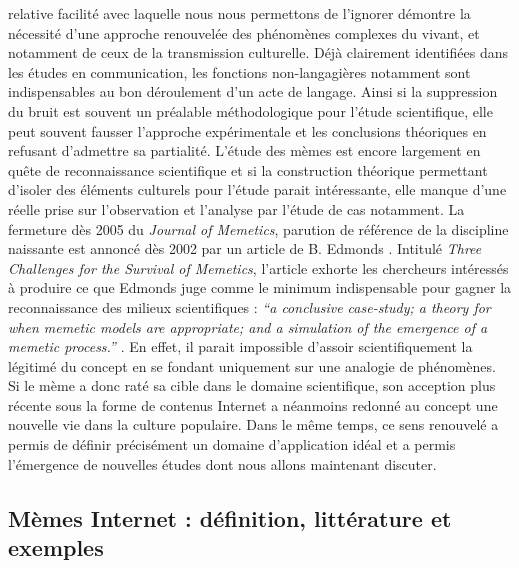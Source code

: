 relative facilit\'e avec laquelle nous nous permettons de l{\textquoteright}ignorer d\'emontre la n\'ecessit\'e d{\textquoteright}une approche renouvel\'ee des ph\'enom\`enes complexes du vivant, et notamment de ceux de la transmission culturelle. D\'ej\`a clairement identifi\'ees dans les \'etudes en communication, les fonctions non-langagi\`eres notamment sont indispensables au bon d\'eroulement d{\textquoteright}un acte de langage. Ainsi si la suppression du bruit est souvent un pr\'ealable m\'ethodologique pour l{\textquoteright}\'etude scientifique, elle peut souvent fausser l{\textquoteright}approche exp\'erimentale et les conclusions th\'eoriques en refusant d{\textquoteright}admettre sa partialit\'e. L{\textquoteright}\'etude des m\`emes est encore largement en qu\^ete de reconnaissance scientifique et si la construction th\'eorique permettant d{\textquoteright}isoler des \'el\'ements culturels pour l{\textquoteright}\'etude parait int\'eressante, elle manque d{\textquoteright}une r\'eelle prise sur l{\textquoteright}observation et l{\textquoteright}analyse par l{\textquoteright}\'etude de cas notamment. La fermeture d\`es 2005 du \textit{Journal of Memetics}, parution de r\'ef\'erence de la discipline naissante est annonc\'e d\`es 2002 par un article de B. Edmonds \cite{Jouxtel2014}. Intitul\'e \textit{Three Challenges for the Survival of Memetics}, l{\textquoteright}article\textit{ }exhorte les chercheurs int\'eress\'es \`a produire ce que Edmonds juge comme le minimum indispensable pour gagner la reconnaissance des milieux scientifiques : \textit{{\textquotedblleft}a conclusive case-study; a theory for when memetic models are appropriate; and a simulation of the emergence of a memetic process.{\textquotedblright}} \cite{Edmonds2002}.  
En effet, il parait impossible d{\textquoteright}assoir scientifiquement la l\'egitim\'e du concept en se fondant uniquement sur une analogie de ph\'enom\`enes. Si le m\`eme a donc rat\'e sa cible dans le domaine scientifique, son acception plus r\'ecente sous la forme de contenus Internet a n\'eanmoins redonn\'e au concept une nouvelle vie dans la culture populaire. Dans le m\^eme temps, ce sens renouvel\'e a permis de d\'efinir pr\'ecis\'ement un domaine d{\textquoteright}application id\'eal et a permis l{\textquoteright}\'emergence de nouvelles \'etudes dont nous allons maintenant discuter. 

\subsection[ M\`emes Internet : d\'efinition, litt\'erature et exemples]{M\`emes Internet : d\'efinition, litt\'erature et exemples}

